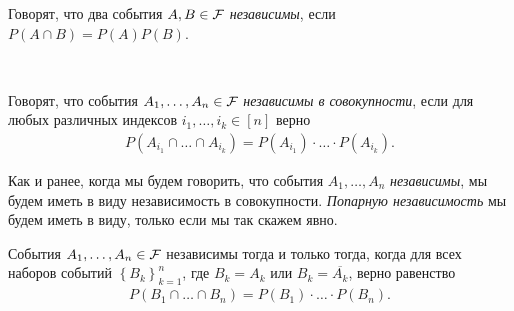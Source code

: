 \documentclass[../main.tex]{subfiles}
\begin{document}
\begin{df}
 Говорят, что два события $A, B \in \mathcal F$ \textit{независимы}, если $P(A \cap B) = P(A) P(B)$.
\end{df}
\begin{df}\

 Говорят, что события $A_1, \ldots, A_n \in \mathcal F$ \textit{независимы в совокупности}, если для любых различных индексов $i_1, \ldots, i_k \in [n]$ верно
 \begin{align*}
  P(A_{i_1}\cap \ldots \cap A_{i_k}) = P(A_{i_1}) \cdot \ldots \cdot P(A_{i_k}).
 \end{align*} 
\end{df}
\begin{conventn*}
 Как и ранее, когда мы будем говорить, что события $A_1, \ldots, A_n$ \textit{независимы}, мы будем иметь в виду независимость в совокупности. \textit{Попарную независимость} мы будем иметь в виду, только если мы так скажем явно.
\end{conventn*}
\begin{remrk}
 \label{remark:independed_complement}
 События $A_1, \ldots, A_n \in \mathcal F$ независимы тогда и только тогда, когда для всех наборов событий $\left\{ B_k \right\}_{k=1}^{n}$, где $B_k = A_k$ или $B_k = \overline{A_k}$, верно равенство
 \begin{align}
  \label{equation:remark:independent_complement}
  P(B_1 \cap \ldots \cap B_n) = P(B_1) \cdot\ldots\cdot P(B_n).
 \end{align}
\end{remrk}
\end{document}
